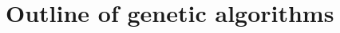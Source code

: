 \section[Outline of genetic algorithms]{\label{identificadorReferenciaCruzada}
Outline of genetic algorithms}
